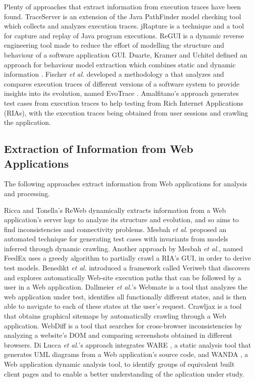 Plenty of approaches that extract information from execution traces have been found. TraceServer \cite{andjelkovic2011trace} is an extension of the Java PathFinder model checking tool \cite{jpf} which collects and analyzes execution traces. jRapture \cite{steven2000jrapture} is a technique and a tool for capture and replay of Java program executions. ReGUI \cite{coimbra2011reverse,coimbra2012dynamic} is a dynamic reverse engineering tool made to reduce the effort of modelling the structure and behaviour of a software application GUI. Duarte, Kramer and Uchitel defined an approach for behaviour model extraction which combines static and dynamic information \cite{duarte2006model}. Fischer \textit{et al.} developed a methodology a that analyzes and compares execution traces of different versions of a software system to provide insights into its evolution, named EvoTrace \cite{fischer2005system}. Amalfitano's approach \cite{amalfitano2010rich} generates test cases from execution traces to help testing from Rich Internet Applications (RIAs), with the execution traces being obtained from user sessions and crawling the application. 


\subsection{Extraction of Information from Web Applications}
The following approaches extract information from Web applications for analysis and processing. 

Ricca and Tonella's ReWeb \cite{ricca2001understanding} dynamically extracts information from a Web application's server logs to analyze its structure and evolution, and so aims to find inconsistencies and connectivity problems. 
Mesbah \textit{et al.} proposed \cite{mesbah2012invariant} an automated technique for generating test cases with invariants from models inferred through dynamic crawling. 
Another approach by Mesbah \textit{et al.}, named FeedEx \cite{fard2013feedback} uses a greedy algorithm to partially crawl a RIA's GUI, in order to derive test models. Benedikt \textit{et al.} introduced a framework called Veriweb \cite{benedikt2002veriweb} that discovers and explores automatically Web-site execution paths that can be followed by a user in a Web application. Dallmeier \textit{et al.}'s Webmate \cite{dallmeier2012webmate,dallmeier2013webmate} is a tool that analyzes the web application under test, identifies all functionally different states, and is then able to navigate to each of these states at the user’s request. Crawljax \cite{roest2010automated} is a tool that obtains graphical sitemaps by automatically crawling through a Web application. WebDiff \cite{choudhary2010webdiff} is a tool that searches for cross-browser inconsistencies by analyzing a website's DOM and comparing screenshots obtained in different browsers. Di Lucca \textit{et al.}'s approach \cite{di2005integrating} integrates WARE \cite{di2004reverse}, a static analysis tool that generates UML diagrams from a Web application's source code, and WANDA \cite{antoniol2004understanding}, a Web application dynamic analysis tool, to identify groups of equivalent built client pages and to enable a better understanding of the aplication under study. 


